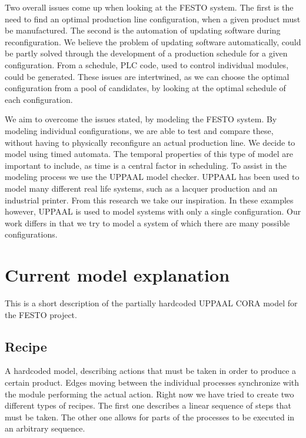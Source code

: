 Two overall issues come up when looking at the FESTO system. The first is the need to find an optimal production line configuration, when a given product must be manufactured. The second is the automation of updating software during reconfiguration. We believe the problem of updating software automatically, could be partly solved through the development of a production schedule for a given configuration. From a schedule, PLC code, used to control individual modules, could be generated. These issues are intertwined, as we can choose the optimal configuration from a pool of candidates, by looking at the optimal schedule of each configuration.

We aim to overcome the issues stated, by modeling the FESTO system. By modeling individual configurations, we are able to test and compare these, without having to physically reconfigure an actual production line. We decide to model using timed automata. The temporal properties of this type of model are important to include, as time is a central factor in scheduling. To assist in the modeling process we use the UPPAAL model checker\cite{Larsen97uppaalin}. UPPAAL has been used to model many different real life systems, such as a lacquer production\cite{so54514} and an industrial printer\cite{Igna2008}. From this research we take our inspiration. In these examples however, UPPAAL is used to model systems with only a single configuration. Our work differs in that we try to model a system of which there are many possible configurations.

\section{Current model explanation}
This is a short description of the partially hardcoded UPPAAL CORA model for the FESTO project.

\subsection{Recipe}
A hardcoded model, describing actions that must be taken in order to produce a certain product. Edges moving between the individual processes synchronize with the module performing the actual action. 
Right now we have tried to create two different types of recipes. The first one describes a linear sequence of steps that must be taken. The other one allows for parts of the processes to be executed in an arbitrary sequence. 

